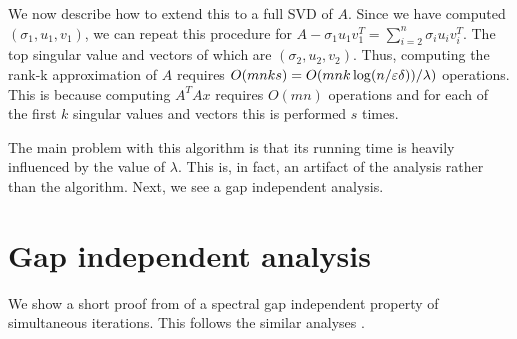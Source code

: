 \documentclass{article}
\begin{document}
We now describe how to extend this to a full SVD of $A$. Since we have computed $(\sigma_1,u_1,v_1)$, we can repeat this
procedure for $A - \sigma_{1}u_{1}v_{1}^{T} = \sum_{i=2}^{n}{\sigma_{i}u_{i}v_{i}^{T}}$. The top singular value and vectors of which are $(\sigma_2,u_2,v_2)$.
Thus, computing the rank-k approximation of $A$ requires $O(mnks)  = O(mnk\log(n/\varepsilon\delta))/\lambda)$ operations. 
This is because computing $A^{T}Ax$ requires $O(mn)$ operations and
for each of the first $k$ singular values and vectors this is performed $s$ times. 

The main problem with this algorithm is that its running time is heavily influenced by the value of $\lambda$.
This is, in fact, an artifact of the analysis rather than the algorithm. Next, we see a gap independent analysis.



\section{Gap independent analysis}
We show a short proof from \cite{liberty2016short} of a spectral gap independent property of simultaneous iterations. This follows the similar analyses \cite{RokhlinST09,HalkoMT2011,MuscoM15,WittenE15}. 
\end{document}
